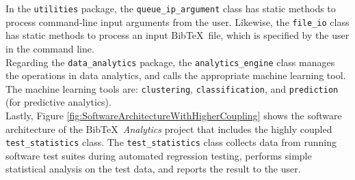 In the {\tt utilities} package, the {\tt queue\_ip\_argument} class has static methods to process command-line input arguments from the user. Likewise, the {\tt file\_io} class has static methods to process an input {\sc Bib}\TeX\ file, which is specified by the user in the command line. \\

Regarding the {\tt data\_analytics} package, the {\tt analytics\_engine} class manages the operations in data analytics, and calls the appropriate machine learning tool. The machine learning tools are: {\tt clustering}, {\tt classification}, and {\tt prediction} (for predictive analytics). \\

Lastly, Figure \ref{fig:SoftwareArchitectureWithHigherCoupling} shows the software architecture of the {\sc Bib}\TeX\ {\it Analytics} project that includes the highly coupled {\tt test\_statistics} class. The {\tt test\_statistics} class collects data from running software test suites during automated regression testing, performs simple statistical analysis on the test data, and reports the result to the user.











